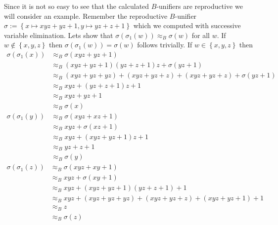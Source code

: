 		Since it is not so easy to see that the calculated $B$-unifiers are reproductive we will consider an example.
		Remember the reproductive $B$-unifier $\sigma:=\left\lbrace x\mapsto xyz+yz+1,y\mapsto yz+z+1\right\rbrace$ which we computed with successive variable elimination. Lets show that $\sigma(\sigma_1(w))\approx_B\sigma(w)$ for all $w$. If $w\notin\left\lbrace x,y,z\right\rbrace $ then $\sigma(\sigma_1(w))=\sigma(w)$ follows trivially. If $w\in\left\lbrace x,y,z\right\rbrace $ then
		\begin{align*}
		\sigma(\sigma_1(x))&\approx_B\sigma(xyz+yz+1)\\
		&\approx_B(xyz+yz+1)(yz+z+1)z+\sigma(yz+1)\\
		&\approx_B(xyz+yz+yz)+(xyz+yz+z)+(xyz+yz+z)+\sigma(yz+1)\\
		&\approx_Bxyz+(yz+z+1)z+1\\
		&\approx_Bxyz+yz+1\\
		&\approx_B\sigma(x)\\
		\sigma(\sigma_1(y))&\approx_B\sigma(xyz+xz+1)\\
		&\approx_Bxyz+\sigma(xz+1)\\
		&\approx_Bxyz+(xyz+yz+1)z+1\\
		&\approx_Byz+z+1\\
		&\approx_B\sigma(y)
		\end{align*}
		\begin{align*}
		\sigma(\sigma_1(z))&\approx_B\sigma(xyz+xy+1)\\
		&\approx_Bxyz+\sigma(xy+1)\\
		&\approx_Bxyz+(xyz+yz+1)(yz+z+1)+1\\
		&\approx_Bxyz+(xyz+yz+yz)+(xyz+yz+z)+(xyz+yz+1)+1\\
		&\approx_Bz\\
		&\approx_B\sigma(z)
		\end{align*}
